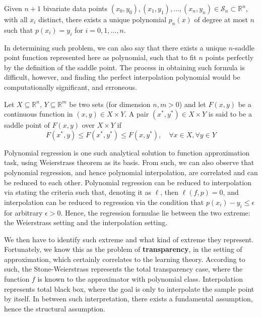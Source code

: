 \documentclass[10pt]{article} %
\begin{document}
\begin{theorem}
    Given $n+1$ bivariate data points $(x_{0},y_{0}),(x_{1},y_{1}),\dots,(x_{n},y_{n})\in \mathcal{S}_{n}\subset \mathbb{R}^{n}$, with all $x_{i}$ distinct, there exists a unique polynomial $p_{n}(x)$ of degree at most $n$ such that $p(x_{i})=y_{i}$ for $i=0,1,\dots,n$.
\end{theorem}

In determining such problem, we can also say that there exists a unique $n$-saddle point function represented here as polynomial, such that to fit $n$ points perfectly by the definition of the saddle point. The process in obtaining such formula is difficult, however, and finding the perfect interpolation polynomial would be computationally significant, and erroneous. 

\begin{definition}
    Let $X\subseteq \mathbb{R}^{n}$, $Y\subseteq \mathbb{R}^{m}$ be two sets (for dimension $n,m>0$) and let $F(x,y)$ be a continuous function in $(x,y)\in X\times Y$. A pair $(x^{*},y^{*})\in X\times Y$ is said to be a saddle point of $F(x,y)$ over $X\times Y$ if \begin{equation}
        F(x^{*},y) \leq F(x^{*},y^{*})\leq F(x,y^{*}), \quad \forall x\in X, \forall y\in Y
    \end{equation}
\end{definition}

Polynomial regression is one such analytical solution to function approximation task, using Weierstrass theorem as its basis. From such, we can also observe that polynomial regression, and hence polynomial interpolation, are correlated and can be reduced to each other. Polynomial regression can be reduced to interpolation via stating the criteria such that, denoting it as $\ell$, then $\ell(f,p)=0$, and interpolation can be reduced to regression via the condition that $p(x_{i})-y_{i}\leq \epsilon$ for arbitrary $\epsilon>0$. Hence, the regression formulae lie between the two extreme: the Weierstrass setting and the interpolation setting. 

We then have to identify such extreme and what kind of extreme they represent. Fortunately, we know this as the problem of \textbf{transparency}, in the setting of approximation, which certainly correlates to the learning theory. According to such, the Stone-Weierstrass represents the total transparency case, where the function $f$ is known to the approximator with polynomial class. Interpolation represents total black box, where the goal is only to interpolate the sample point by itself. In between such interpretation, there exists a fundamental assumption, hence the structural assumption. 
\end{document}
